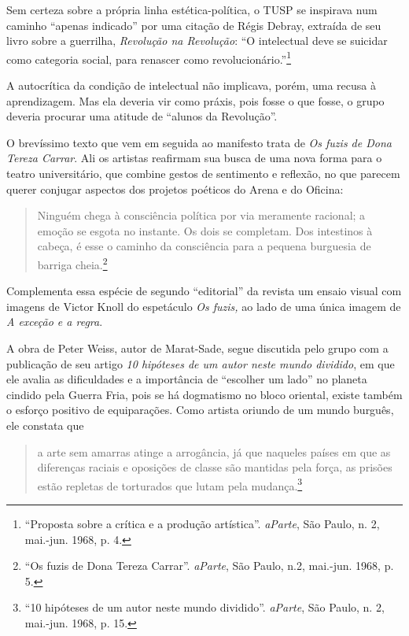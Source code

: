Sem certeza sobre a própria linha estética-política, o TUSP se inspirava
num caminho “apenas indicado” por uma citação de Régis Debray, extraída
de seu livro sobre a guerrilha, \textit{Revolução na Revolução}: “O
intelectual deve se suicidar como categoria social, para renascer como
revolucionário.”\footnote{“Proposta sobre a crítica e a produção
  artística”. \textit{aParte}, São Paulo, n. 2, mai.-jun. 1968, p. 4.}

A autocrítica da condição de intelectual não implicava, porém, uma
recusa à aprendizagem. Mas ela deveria vir como práxis, pois fosse o que
fosse, o grupo deveria procurar uma atitude de “alunos da Revolução”.

O brevíssimo texto que vem em seguida ao manifesto trata de \textit{Os
fuzis de Dona Tereza Carrar}. Ali os artistas reafirmam sua busca de uma
nova forma para o teatro universitário, que combine gestos de sentimento
e reflexão, no que parecem querer conjugar aspectos dos projetos
poéticos do Arena e do Oficina:

\begin{quote}
Ninguém chega à consciência política por via meramente racional; a
emoção se esgota no instante. Os dois se completam. Dos intestinos à
cabeça, é esse o caminho da consciência para a pequena burguesia de
barriga cheia.\footnote{“Os fuzis de Dona Tereza Carrar”. \textit{aParte},
  São Paulo, n.2, mai.-jun. 1968, p. 5.}
\end{quote}

Complementa essa espécie de segundo “editorial” da revista um ensaio
visual com imagens de Victor Knoll do espetáculo \textit{Os fuzis,} ao lado
de uma única imagem de \textit{A exceção e a regra}.

A obra de Peter Weiss, autor de Marat-Sade, segue discutida pelo grupo
com a publicação de seu artigo \textit{10 hipóteses de um autor neste mundo
dividido}, em que ele avalia as dificuldades e a importância de
“escolher um lado” no planeta cindido pela Guerra Fria, pois se há
dogmatismo no bloco oriental, existe também o esforço positivo de
equiparações. Como artista oriundo de um mundo burguês, ele constata que

\begin{quote}
a arte sem amarras atinge a arrogância, já que naqueles países em que as
diferenças raciais e oposições de classe são mantidas pela força, as
prisões estão repletas de torturados que lutam pela mudança.\footnote{“10
  hipóteses de um autor neste mundo dividido”. \textit{aParte}, São Paulo,
  n. 2, mai.-jun. 1968, p. 15.}
\end{quote}


